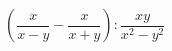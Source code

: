 \begin{ex}
	\begin{condition}
		\( \left( \dfrac{x}{x-y}-\dfrac{x}{x+y} \right):\dfrac{xy}{x^2-y^2} \)
	\end{condition}
\end{ex}